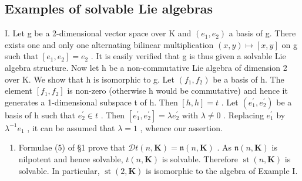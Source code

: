 \subsection*{Examples of solvable Lie algebras}

I. Let g be a 2-dimensional vector space over K and \((e_{1}, e_{2})\) a basis of g. There exists one and only one alternating bilinear multiplication \((x, y) \mapsto [x, y]\) on g such that \([e_{1}, e_{2}] = e_{2}\) . It is easily verified that g is thus given a solvable Lie algebra structure. Now let h be a non-commutative Lie algebra of dimension 2 over K. We show that h is isomorphic to g. Let \((f_{1}, f_{2})\) be a basis of h. The element \([f_{1}, f_{2}]\) is non-zero (otherwise h would be commutative) and hence it generates a 1-dimensional subspace t of h. Then \([h, h] = t\) . Let \((e_{1}^{\prime}, e_{2}^{\prime})\) be a basis of h such that \(e_{2}^{\prime} \in t\) . Then \([e_{1}^{\prime}, e_{2}^{\prime}] = \lambda e_{2}^{\prime}\) with \(\lambda \neq 0\) . Replacing \(e_{1}^{\prime}\) by \(\lambda^{-1}e_{1}\) , it can be assumed that \(\lambda = 1\) , whence our assertion.

\begin{enumerate}
\def\labelenumi{\Roman{enumi}.}
\setcounter{enumi}{1}
\tightlist
\item
  Formulae (5) of §1 prove that \(\mathcal{D}t(n, \mathbf{K}) = \mathfrak{n}(n, \mathbf{K})\) . As \(\mathfrak{n}(n, \mathbf{K})\) is nilpotent and hence solvable, \(t(n, \mathbf{K})\) is solvable. Therefore \(\operatorname{st}(n, \mathbf{K})\) is solvable. In particular, \(\operatorname{st}(2, \mathbf{K})\) is isomorphic to the algebra of Example I.
\end{enumerate}

